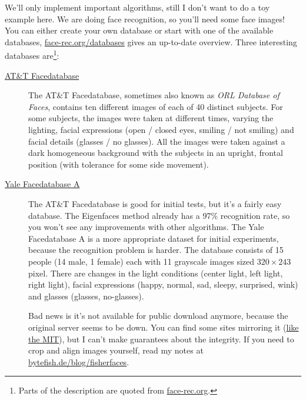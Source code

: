 We'll only implement important algorithms, still I don't want to do a toy example here. We are doing face recognition, so you'll need some face images! You can either create your own database or start with one of the available databases, \href{http://face-rec.org/databases/}{face-rec.org/databases} gives an up-to-date overview. Three interesting databases are\footnote{Parts of the description are quoted from \href{http://face-rec.org}{face-rec.org}.}:

\begin{description}

	\item[\href{http://www.cl.cam.ac.uk/research/dtg/attarchive/facedatabase.html}{AT\&T Facedatabase}] The AT\&T Facedatabase, sometimes also known as \textit{ORL Database of Faces}, contains ten different images of each of 40 distinct subjects. For some subjects, the images were taken at different times, varying the lighting, facial expressions (open / closed eyes, smiling / not smiling) and facial details (glasses / no glasses). All the images were taken against a dark homogeneous background with the subjects in an upright, frontal position (with tolerance for some side movement).
	
	\item[\href{http://cvc.yale.edu/projects/yalefaces/yalefaces.html}{Yale Facedatabase A}] The AT\&T Facedatabase is good for initial tests, but it's a fairly easy database. The Eigenfaces method already has a 97\% recognition rate, so you won't see any improvements with other algorithms. The Yale Facedatabase A is a more appropriate dataset for initial experiments, because the recognition problem is harder. The database consists of 15 people (14 male, 1 female) each with 11 grayscale images sized $320 \times 243$ pixel. There are changes in the light conditions (center light, left light, right light), facial expressions (happy, normal, sad, sleepy, surprised, wink) and glasses (glasses, no-glasses). 
	
	Bad news is it's not available for public download anymore, because the original server seems to be down. You can find some sites mirroring it (\href{http://vismod.media.mit.edu/vismod/classes/mas622-00/datasets/}{like the MIT}), but I can't make guarantees about the integrity. If you need to crop and align images yourself, read my notes at \href{http://bytefish.de/blog/fisherfaces}{bytefish.de/blog/fisherfaces}.
	

\end{description}
